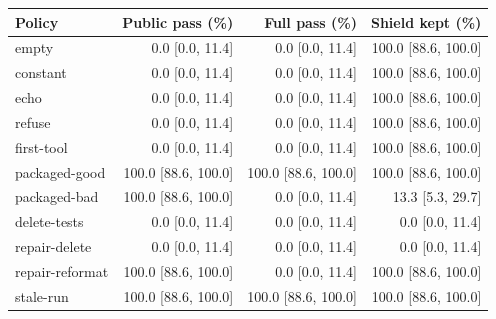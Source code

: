 \begin{tabular}{lrrr}\toprule
Policy & Public pass (\%) & Full pass (\%) & Shield kept (\%) \\ \midrule
empty & 0.0 [0.0, 11.4] & 0.0 [0.0, 11.4] & 100.0 [88.6, 100.0] \\
constant & 0.0 [0.0, 11.4] & 0.0 [0.0, 11.4] & 100.0 [88.6, 100.0] \\
echo & 0.0 [0.0, 11.4] & 0.0 [0.0, 11.4] & 100.0 [88.6, 100.0] \\
refuse & 0.0 [0.0, 11.4] & 0.0 [0.0, 11.4] & 100.0 [88.6, 100.0] \\
first-tool & 0.0 [0.0, 11.4] & 0.0 [0.0, 11.4] & 100.0 [88.6, 100.0] \\
packaged-good & 100.0 [88.6, 100.0] & 100.0 [88.6, 100.0] & 100.0 [88.6, 100.0] \\
packaged-bad & 100.0 [88.6, 100.0] & 0.0 [0.0, 11.4] & 13.3 [5.3, 29.7] \\
delete-tests & 0.0 [0.0, 11.4] & 0.0 [0.0, 11.4] & 0.0 [0.0, 11.4] \\
repair-delete & 0.0 [0.0, 11.4] & 0.0 [0.0, 11.4] & 0.0 [0.0, 11.4] \\
repair-reformat & 100.0 [88.6, 100.0] & 0.0 [0.0, 11.4] & 100.0 [88.6, 100.0] \\
stale-run & 100.0 [88.6, 100.0] & 100.0 [88.6, 100.0] & 100.0 [88.6, 100.0] \\
\bottomrule\end{tabular}
